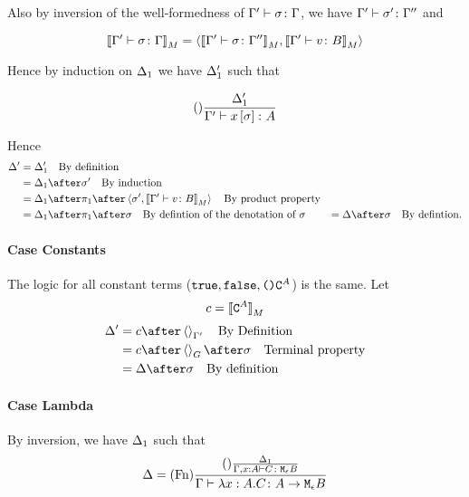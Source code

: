 \documentclass{report}
\begin{document}
Also by inversion of the well-formedness of $\Gamma' \vdash \sigma \colon \Gamma$, we have $\Gamma' \vdash \sigma' \colon \Gamma''$ and 

\begin{equation}
    {\bf [\![}\Gamma' \vdash \sigma \colon \Gamma{\bf ]\!]}_M = \left\langle{\bf [\![}\Gamma' \vdash \sigma \colon \Gamma''{\bf ]\!]}_M, {\bf [\![}\Gamma' \vdash v \colon B{\bf ]\!]}_M\right\rangle
\end{equation}

Hence by induction on $\Delta_1$ we have $\Delta_1'$ such that

\begin{equation}
    (\text{}) \frac{\Delta_1'}{\Gamma' \vdash x\left[\sigma\right] \colon A}
\end{equation}



Hence
\begin{align}
    \D' & = \D_1' \qt{By definition}\\
        & = \D_1\after\si'\qt{By induction}\\
        & = \D_1\after\p\after\pr{\si'}{\deno{\typerelation{\G'}{v}{B}}}\qt{By product property}\\
        & = \D_1\after\p\after\si\qt{By defintion of the denotation of $\si$}
        & = \D\after\si\qt{By defintion.}
\end{align}

\paragraph{Case Constants}
The logic for all constant terms ($\texttt{true},\texttt{false},\texttt{()}\texttt{C}^{A}$) is the same.
Let
\begin{equation}
    c = {\bf [\![}\texttt{C}^{A}{\bf ]\!]}_M
\end{equation}
\begin{align}
    \D' & = c\after\term{\G'}\qt{By Definition}\\
        & = c\after\term{G}\after\si\qt{Terminal property}\\
        & = \D\after\si\qt{By definition}
\end{align}
\paragraph{Case Lambda}

By inversion, we have $\Delta_1$ such that
\begin{equation}
    \Delta = (\text{Fn}) \frac{
        (\text{}) \frac{\Delta_1}{\Gamma, x:A \vdash C \colon \texttt{M}_{\epsilon}{B}}
    }{\Gamma \vdash \lambda x : A. C \colon A \rightarrow \texttt{M}_{\epsilon}{B}}
\end{equation}
\end{document}
